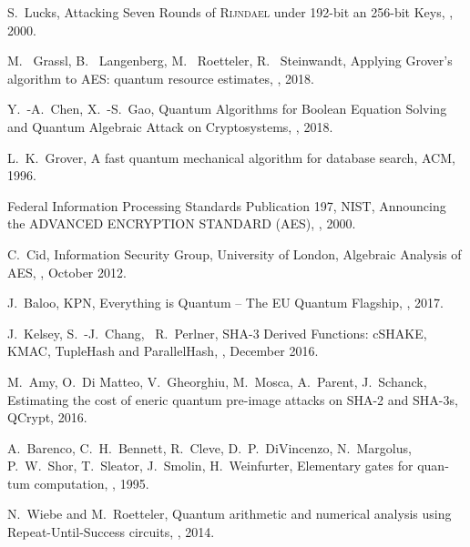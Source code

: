 \documentclass[a4paper,11pt]{article}
\begin{document}
\begin{otherlanguage}{english}
\begin{multicols}{2}
\begin{thebibliography}{1}
S.~Lucks,
\newblock Attacking Seven Rounds of \textsc{Rijndael} under 192-bit an 256-bit Keys,
, 2000.

M.~ Grassl, B.~ Langenberg, M.~ Roetteler, R.~ Steinwandt,
\newblock Applying Grover’s algorithm to AES: quantum resource estimates,
, 2018.

Y.~-A.~Chen, X.~-S.~Gao,
\newblock Quantum Algorithms for Boolean Equation Solving and Quantum Algebraic Attack on Cryptosystems,
, 2018.

L.~K.~Grover,
\newblock A fast quantum mechanical algorithm for database search, 
 ACM, 1996.

Federal Information Processing Standards Publication 197, NIST,
\newblock Announcing the ADVANCED ENCRYPTION STANDARD (AES),
, 2000.

C.~Cid, Information Security Group, University of London,
\newblock Algebraic Analysis of AES,
, October 2012.

J.~Baloo, KPN,
\newblock Everything is Quantum – The EU Quantum Flagship, 
, 2017.

J.~Kelsey, S.~-J.~Chang, ~R.~Perlner,
\newblock SHA-3 Derived Functions: cSHAKE, KMAC, TupleHash and ParallelHash, 
, December 2016.

M.~Amy, O.~Di Matteo, V.~Gheorghiu, M.~Mosca, A.~Parent, J.~Schanck,
\newblock Estimating the cost of eneric quantum pre-image attacks on SHA-2 and SHA-3s, 
 QCrypt, 2016.

A.~Barenco, C.~H.~Bennett, R.~Cleve, D.~P.~DiVincenzo, N.~Margolus, P.~W.~Shor, T.~Sleator, J.~Smolin, H.~Weinfurter,
\newblock Elementary gates for quantum computation, 
, 1995.

N.~Wiebe and M.~Roetteler,
\newblock Quantum arithmetic and numerical analysis using Repeat-Until-Success circuits, 
, 2014.
  
\end{thebibliography}


\end{multicols}


\end{otherlanguage}
\end{document}
